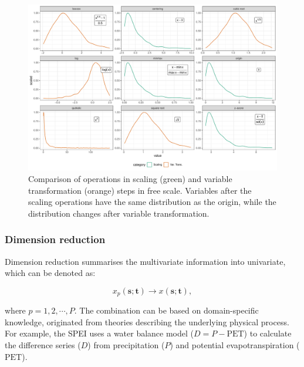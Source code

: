 \documentclass[
]{interact}
\begin{document}
\begin{figure}

{\centering \includegraphics{tidyindex_files/figure-pdf/fig-scale-var-trans-compare-1.pdf}

}

\caption{\label{fig-scale-var-trans-compare}Comparison of operations in
scaling (green) and variable transformation (orange) steps in free
scale. Variables after the scaling operations have the same distribution
as the origin, while the distribution changes after variable
transformation.}

\end{figure}

\newpage

\hypertarget{dimension-reduction}{%
\subsubsection{Dimension reduction}\label{dimension-reduction}}

Dimension reduction summarises the multivariate information into
univariate, which can be denoted as:

\begin{equation}
x_p(\mathbf{s}; \mathbf{t}) \rightarrow x(\mathbf{s}; \mathbf{t}),
\end{equation}

where \(p = 1, 2, \cdots, P\). The combination can be based on
domain-specific knowledge, originated from theories describing the
underlying physical process. For example, the SPEI uses a water balance
model (\(D = P - \text{PET}\)) to calculate the difference series
(\(D\)) from precipitation (\(P\)) and potential evapotranspiration
(\(\text{PET}\)).
\end{document}
